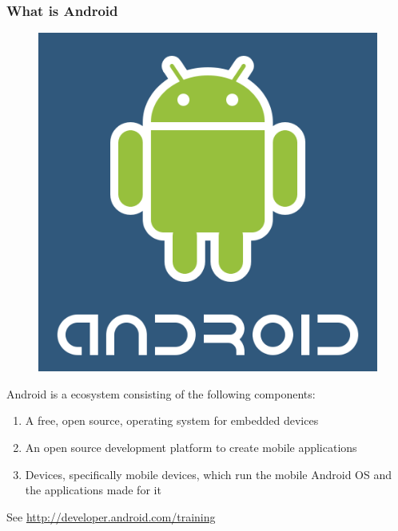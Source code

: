 \documentclass{beamer}
\begin{document}
{
\begin{frame}[plain]
\end{frame}
}

\begin{frame}
	\frametitle{What is Android}
	
	\begin{figure}
		\centering
			\includegraphics[width=0.3 \textwidth]{img/androidlogo.png}
		\label{fig:androidlogo}
	\end{figure}
	
	Android is a ecosystem consisting of the following components:
	
	\begin{enumerate}
		\item A free, open source, operating system for embedded devices \pause
		\item An open source development platform to create mobile applications \pause
		\item Devices, specifically mobile devices, which run the mobile Android OS and the applications made for it
	\end{enumerate}
	 
	See \url{http://developer.android.com/training}
	
\end{frame}
\end{document}
